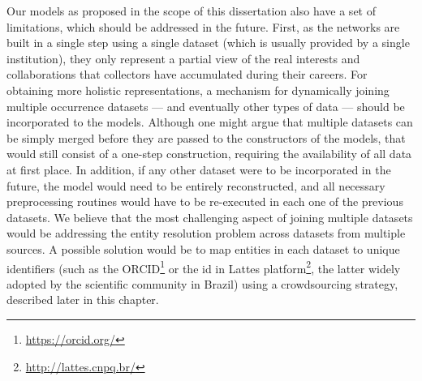 Our models as proposed in the scope of this dissertation also have a set of limitations, which should be addressed in the future.
First, as the networks are built in a single step using a single dataset (which is usually provided by a single institution), they only represent a partial view of the real interests and collaborations that collectors have accumulated during their careers.
For obtaining more holistic representations, a mechanism for dynamically joining multiple occurrence datasets --- and eventually other types of data --- should be incorporated to the models.
Although one might argue that multiple datasets can be simply merged before they are passed to the constructors of the models, that would still consist of a one-step construction, requiring the availability of all data at first place.
In addition, if any other dataset were to be incorporated in the future, the model would need to be entirely reconstructed, and all necessary preprocessing routines would have to be re-executed in each one of the previous datasets.
%
We believe that the most challenging aspect of joining multiple datasets would be addressing the entity resolution problem across datasets from multiple sources. A possible solution would be to map entities in each dataset to unique identifiers (such as the ORCID\footnote{\url{https://orcid.org/}} or the id in Lattes platform\footnote{\url{http://lattes.cnpq.br/}}, the latter widely adopted by the scientific community in Brazil) using a crowdsourcing strategy, described later in this chapter.

